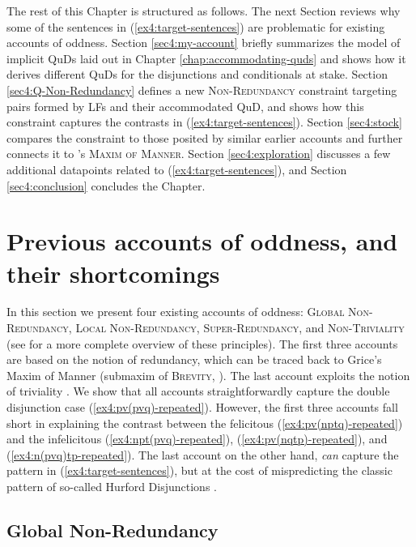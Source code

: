 The rest of this Chapter is structured as follows. The next Section reviews why some of the sentences in (\ref{ex4:target-sentences}) are problematic for existing accounts of oddness. Section \ref{sec4:my-account} briefly summarizes the model of implicit QuDs laid out in Chapter \ref{chap:accommodating-quds} and shows how it derives different QuDs for the disjunctions and conditionals at stake. Section \ref{sec4:Q-Non-Redundancy} defines a new \textsc{Non-Redundancy} constraint targeting pairs formed by LFs and their accommodated QuD, and shows how this constraint captures the contrasts in (\ref{ex4:target-sentences}). Section \ref{sec4:stock} compares the constraint to those posited by similar earlier accounts and further connects it to \citeauthor{Grice1975}'s  \textsc{Maxim of Manner}.
Section \ref{sec4:exploration} discusses a few additional datapoints related to (\ref{ex4:target-sentences}), and Section \ref{sec4:conclusion} concludes the Chapter.

\section{Previous accounts of oddness, and their shortcomings}\label{sec4:previous-accounts}

In this section we present four existing accounts of oddness: \textsc{Global Non-Redundancy}, \textsc{Local Non-Redundancy}, \textsc{Super-Redundancy}, and \textsc{Non-Triviality} (see  for a more complete overview of these principles). The first three accounts are based on the notion of redundancy, which can be traced back to Grice's Maxim of Manner (submaxim of \textsc{Brevity}, ). The last account exploits the notion of triviality \citep{Stalnaker1974}. We show that all accounts straightforwardly capture the double disjunction case (\ref{ex4:pv(pvq)-repeated}). However, the first three accounts fall short in explaining the contrast between the felicitous (\ref{ex4:pv(nptq)-repeated}) and the infelicitous (\ref{ex4:npt(pvq)-repeated}), (\ref{ex4:pv(nqtp)-repeated}), and (\ref{ex4:n(pvq)tp-repeated}). The last account on the other hand, \textit{can} capture the pattern in (\ref{ex4:target-sentences}), but at the cost of mispredicting the classic pattern of so-called Hurford Disjunctions \citep{Hurford1974}.

\subsection{Global Non-Redundancy}

